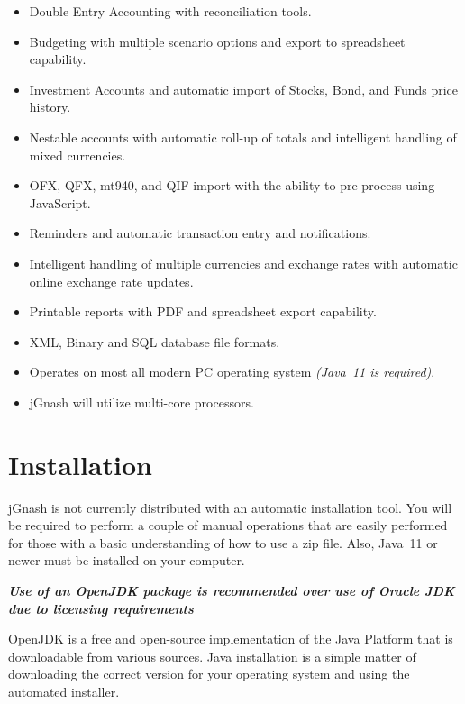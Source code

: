 \documentclass[letterpaper,12pt]{book}
\begin{document}
    \begin{itemize}
        \item Double Entry Accounting with reconciliation tools.
        \item Budgeting with multiple scenario options and export to spreadsheet capability.
        \item Investment Accounts and automatic import of Stocks, Bond, and Funds price history.
        \item Nestable accounts with automatic roll-up of totals and intelligent handling of mixed currencies.
        \item OFX, QFX, mt940, and QIF import with the ability to pre-process using JavaScript.
        \item Reminders and automatic transaction entry and notifications.
        \item Intelligent handling of multiple currencies and exchange rates with automatic online exchange rate updates.
        \item Printable reports with PDF and spreadsheet export capability.
        \item XML, Binary and SQL database file formats.
        \item Operates on most all modern PC operating system \textit{(Java\texttrademark~11 is required)}.
        \item jGnash will utilize multi-core processors.
    \end{itemize}

    \section{Installation}\label{sec:installation}
    jGnash is not currently distributed with an automatic installation tool.
    You will be required to perform a couple of manual operations that are easily performed for those with a basic
    understanding of how to use a zip file.
    Also, Java\texttrademark~11 or newer must be installed on your computer.

    \textit{\textbf{Use of an OpenJDK package is recommended over use of Oracle JDK due to licensing requirements}}

    OpenJDK is a free and open-source implementation of the Java Platform that is downloadable from various sources.
    Java installation is a simple matter of downloading the correct version for your operating system and using the
    automated installer.
\end{document}
